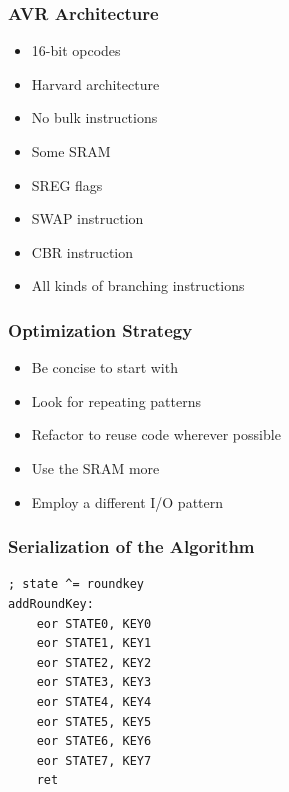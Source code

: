 \documentclass{beamer}
\begin{document}
\begin{frame}
\frametitle{AVR Architecture}
        \begin{itemize}
        \item 16-bit opcodes
        \item Harvard architecture
        \item No bulk instructions
        \item Some SRAM
        \item SREG flags
        \item SWAP instruction
        \item CBR instruction
        \item All kinds of branching instructions
        \end{itemize}
\end{frame}

\begin{frame}
\frametitle{Optimization Strategy}
        \begin{itemize}
        \item Be concise to start with
        \item Look for repeating patterns
        \item Refactor to reuse code wherever possible
        \item Use the SRAM more
        \item Employ a different I/O pattern
        \end{itemize}
\end{frame}

\begin{frame}[fragile]
\frametitle{Serialization of the Algorithm}
\begin{lstlisting}
; state ^= roundkey
addRoundKey:
    eor STATE0, KEY0
    eor STATE1, KEY1
    eor STATE2, KEY2
    eor STATE3, KEY3
    eor STATE4, KEY4
    eor STATE5, KEY5
    eor STATE6, KEY6
    eor STATE7, KEY7
    ret
\end{lstlisting}
\end{frame}
\end{document}

